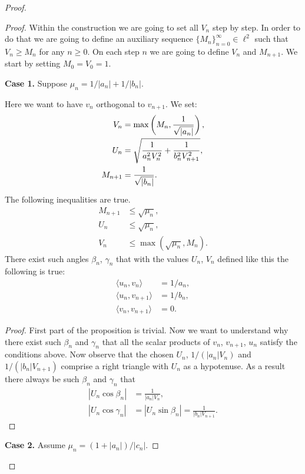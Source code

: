 \begin{proof}
\begin{proof}
        Within the construction we are going to set all $V_n$ step by step.
        In order to do that we are going to define an auxiliary sequence $\{M_n\}_{n=0}^\infty \in \ell^2$ such that $V_n \geq M_n$ for any $n \geq 0$.
        On each step $n$ we are going to define $V_n$ and $M_{n+1}$.
        We start by setting $M_0 = V_0 = 1$.

        \noindent\textbf{Case 1.} Suppose $\mu_n = 1/|a_n| + 1/|b_n|$.

          Here we want to have $v_n$ orthogonal to $v_{n+1}$.
          We set:
          \begin{align*}
              V_n &= \max\left(M_n, \frac{1}{\sqrt{\smash[b]{|a_n|}}}\right),\\
              U_n &= \sqrt{\frac{1}{a_n^2 V_n^2} + \frac{1}{b_n^2 V_{n+1}^2}},\\
              M_{n+1} &= \frac{1}{\sqrt{\smash[b]{|b_n|}}}.
          \end{align*}
          \begin{prop}
            The following inequalities are true.
            \begin{align*}
              M_{n+1} &\leq \sqrt{\mu_n},\\
              U_n &\leq \sqrt{\mu_n},\\
              V_n &\leq \max(\sqrt{\mu_n}, M_n).
            \end{align*}
            There exist such angles $\beta_n$, $\gamma_n$ that with the values $U_n$, $V_n$ defined like this the following is true:
            \begin{align*}
              \langle u_n, v_n \rangle &= 1/a_n,\\
              \langle u_n, v_{n+1} \rangle &= 1/b_n,\\
              \langle v_n, v_{n+1} \rangle &= 0.
            \end{align*}
          \end{prop}
          \begin{proof}
            First part of the proposition is trivial.
            Now we want to understand why there exist such $\beta_n$ and $\gamma_n$ that all the scalar products of
            $v_n$, $v_{n+1}$, $u_n$ satisfy the conditions above.
            Now observe that the chosen $U_n$, $1/(|a_n| V_n)$ and $1/(|b_n| V_{n+1})$ 
              comprise a right triangle with $U_n$ as a hypotenuse.
            As a result there always be such $\beta_n$ and $\gamma_n$ that
            \begin{align*}
              |U_n \cos{\beta_n}| &= \frac{1}{|a_n|V_n},\\
              \left|U_n \cos{\gamma_n}\right| &= \left|U_n \sin{\beta_n}\right| = \frac{1}{|b_n|V_{n+1}}.
            \end{align*}
          \end{proof}
        \noindent\textbf{Case 2.} Assume $\mu_n = (1 + |a_n|)/|c_n|$.


\end{proof}
\end{proof}

